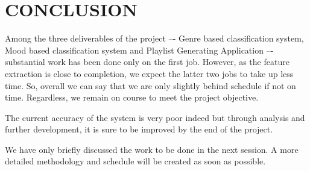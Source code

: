 \newpage
\section{CONCLUSION}

Among the three deliverables of the project –- Genre based classification system, Mood based classification system and Playlist Generating Application –- substantial
work has been done only on the first job. However, as the feature extraction is close to completion, we expect the latter two jobs to take up less time. So, overall
we can say that we are only slightly behind schedule if not on time. Regardless, we remain on course to meet the project objective.  
\par The current accuracy of the system is very poor indeed but through analysis and further development, it is sure to be improved by the
end of the project. 
\par  We have only briefly discussed the work to be done in the next session. A more detailed methodology and schedule will be created as soon
as possible.
